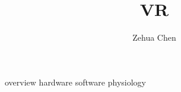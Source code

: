 \documentclass[letterpaper, 11pt]{report}
\title{VR}
\author{Zehua Chen}
\begin{document}
  \maketitle
  \tableofcontents

  {overview}
  {hardware}
  {software}
  {physiology}
\end{document}
